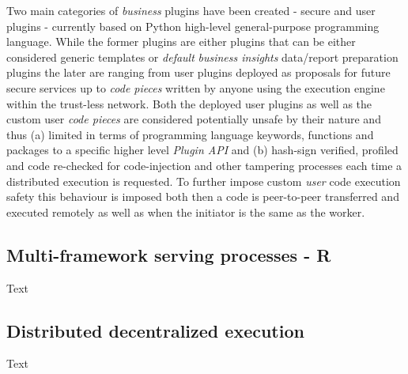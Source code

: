 \documentclass{article}
\begin{document}
Two main categories of \emph{business} plugins have been created - secure and user plugins - currently based on Python\cite{vanrossum1995python} high-level general-purpose programming language. While the former plugins are either plugins that can be either considered generic templates or \emph{default} \emph{business insights} data/report preparation plugins the later are ranging from user plugins deployed as proposals for future secure services up to \emph{code pieces} written by anyone using the execution engine within the trust-less network. Both the deployed user plugins as well as the custom user \emph{code pieces} are considered potentially unsafe by their nature and thus (a) limited in terms of programming language keywords, functions and packages to a specific higher level \emph{Plugin API} and (b) hash-sign verified, profiled and code re-checked for code-injection and other tampering processes each time a distributed execution is requested. To further impose custom \emph{user} code execution safety this behaviour is imposed both then a code is peer-to-peer transferred and executed remotely as well as when the initiator is the same as the worker.

\subsection{Multi-framework serving processes - R}
Text
\subsection{Distributed decentralized execution}
Text
  
\end{document}
